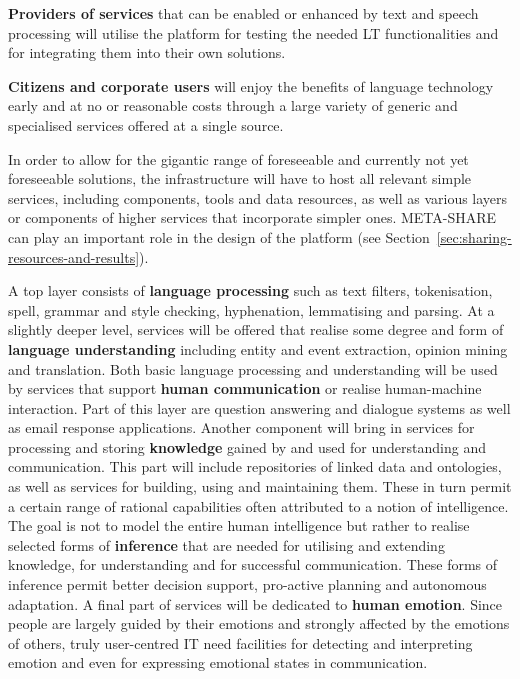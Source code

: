 \documentclass[10pt, plain]{../../metanetpaper}
\begin{document}
\begin{multicols}{2}
\textbf{Providers of services} that can be enabled or enhanced by text and speech processing will utilise the platform for testing the needed LT functionalities and for integrating them into their own solutions.

\textbf{Citizens and corporate users} will enjoy the benefits of language technology early and at no or reasonable costs through a large variety of generic and specialised services offered at a single source.

In order to allow for the gigantic range of foreseeable and currently not yet foreseeable solutions, the infrastructure will have to host all relevant simple services, including components, tools and data resources, as well as various layers or components of higher services that incorporate simpler ones. META-SHARE can play an important role in the design of the platform (see Section~\ref{sec:sharing-resources-and-results}).
 
A top layer consists of \textbf{language processing} such as text filters, tokenisation, spell, grammar and style checking, hyphenation, lemmatising and parsing. At a slightly deeper level, services will be offered that realise some degree and form of \textbf{language understanding} including entity and event extraction, opinion mining and translation. Both basic language processing and understanding will be used by services that support \textbf{human communication} or realise human-machine interaction. Part of this layer are question answering and dialogue systems as well as email response applications. Another component will bring in services for processing and storing \textbf{knowledge} gained by and used for understanding and communication. This part will include repositories of linked data and ontologies, as well as services for building, using and maintaining them. These in turn permit a certain range of rational capabilities often attributed to a notion of intelligence. The goal is not to model the entire human intelligence but rather to realise selected forms of \textbf{inference} that are needed for utilising and extending knowledge, for understanding and for successful communication. These forms of inference permit better decision support, pro-active planning and autonomous adaptation. A final part of services will be dedicated to \textbf{human emotion}. Since people are largely guided by their emotions and strongly affected by the emotions of others, truly user-centred IT need facilities for detecting and interpreting emotion and even for expressing emotional states in communication. 


\end{multicols}
\end{document}
